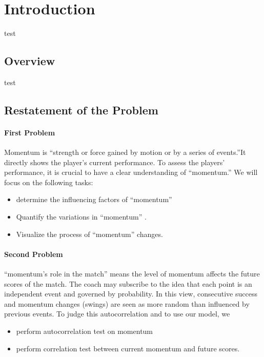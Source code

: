 \setcounter{page}{1}

\section{Introduction}

test

\subsection{Overview}

test

\subsection{Restatement of the Problem}

\paragraph{First Problem}

Momentum is “strength or force gained by motion or by a series of 
events.”It directly shows the player's current performance.
To assess the players' performance, it is crucial to have a clear understanding of ``momentum.'' 
We will focus on the following tasks: 
\begin{itemize}
    \item determine the influencing factors of ``momentum''
    \item Quantify the variations in ``momentum'' .
    \item Visualize the process of ``momentum'' changes.
\end{itemize}

\paragraph{Second Problem}

``momentum's role in the match'' means the level of momentum affects the future scores of the match.
The coach may subscribe to the idea that each point is an independent event and governed by probability.
In this view, consecutive success and momentum changes (swings) are seen as more random than influenced by previous events.
To judge this autocorrelation and to use our model, we 

\begin{itemize}
    \item perform autocorrelation test on momentum
    \item perform correlation test between current momentum and future scores.
\end{itemize}

